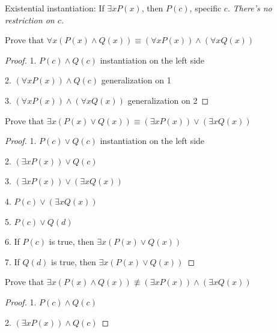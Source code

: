 \begin{defn}

Existential instantiation: If $\exists x P(x)$, then $P(c)$, specific $c$. \textit{There's no restriction on $c$.}

\begin{ex}

Prove that $\forall x (P(x) \land Q(x)) \equiv (\forall x P(x)) \land (\forall x Q(x))$

\end{ex}

\begin{proof}

1. $P(c) \land Q(c)$ instantiation on the left side

2. $(\forall x P(x)) \land Q(c)$ generalization on 1

3. $(\forall x P(x)) \land (\forall x Q(x))$ generalization on 2

\end{proof}

\begin{prob}

Prove that $\exists x (P(x) \lor Q(x)) \equiv (\exists x P(x)) \lor (\exists x Q(x))$

\end{prob}

\begin{proof}

1. $P(c) \lor Q(c)$ instantiation on the left side

2. $(\exists x P(x)) \lor Q(c)$

3. $(\exists x P(x)) \lor (\exists x Q(x))$

4. $P(c) \lor (\exists x Q(x))$

5. $P(c) \lor Q(d)$

6. If $P(c)$ is true, then $\exists x (P(x) \lor Q(x))$

7. If $Q(d)$ is true, then $\exists x (P(x) \lor Q(x))$

\end{proof}

\begin{prob}

Prove that $\exists x (P(x) \land Q(x)) \not \equiv (\exists x P(x)) \land (\exists x Q(x))$

\end{prob}

\begin{proof}

1. $P(c) \land Q(c)$

2. $(\exists x P(x)) \land Q(c)$


\end{proof}
\end{defn}
